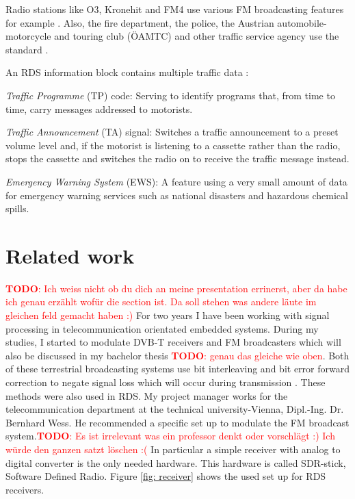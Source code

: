 \documentclass[conference,11pt,a4paper]{IEEEtran}
\newcommand{\todo}[1]{\textcolor{red}{\textbf{TODO}: #1}}
\begin{document}
		Radio stations like O3, Kronehit and FM4 use various FM broadcasting features for example \cite{Stau}. Also, the fire department, the police, the Austrian automobile- motorcycle and touring club (ÖAMTC) and other traffic service agency use the standard \cite{standard}.
		
		An RDS information block contains multiple traffic data \cite{Dietman}: 
				
		\textit{Traffic Programme} (TP) code: Serving to identify programs that, from time to time, carry messages addressed to motorists.
		
		\textit{Traffic Announcement} (TA) signal: Switches a traffic announcement to a preset volume level and, if the motorist is listening to a cassette rather than the radio, stops the cassette and switches the radio on to receive the traffic message instead.
		
		\textit{Emergency Warning System} (EWS): A feature using a very small amount of data for emergency warning services such as national disasters and hazardous chemical spills.
		\\
		
	
	\section{Related work}
		\todo{Ich weiss nicht ob du dich an meine presentation errinerst, aber da habe ich genau erzählt wofür die section ist. Da soll stehen was andere läute im gleichen feld gemacht haben :)}
		For two years I have been working with signal processing in telecommunication orientated embedded systems. During my studies, I started to modulate DVB-T receivers and FM broadcasters which will also be discussed in my bachelor thesis \todo{genau das gleiche wie oben}. Both of these terrestrial broadcasting systems use bit interleaving and bit error forward correction to negate signal loss which will occur during transmission \cite{Terre}. These methods were also used in RDS. My project manager works for the telecommunication department at the technical university-Vienna, Dipl.-Ing. Dr. Bernhard Wess. He recommended a specific set up to modulate the FM broadcast system.\todo{Es ist irrelevant was ein professor denkt oder vorschlägt :) Ich würde den ganzen satzt löschen :(} In particular a simple receiver with analog to digital converter is the only needed hardware. This hardware is called SDR-stick, Software Defined Radio. Figure \ref{fig: receiver} shows the used set up for RDS receivers.
\end{document}

